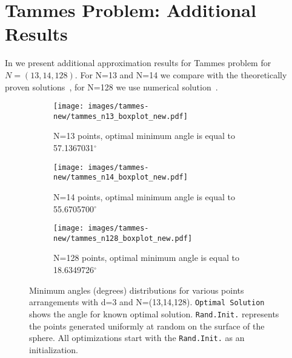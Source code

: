 \documentclass[10pt]{article} %
\begin{document}
\section{Tammes Problem: Additional Results}
\label{app:tammes}
In we present additional approximation results for Tammes problem for $N=(13,14,128)$. For N=13 and N=14 we compare with the theoretically proven solutions~\citep{musin-2012,tammes-problem-for-n14}, for N=128 we use numerical solution~\citep{table-spherical-codes}.

\begin{figure}[ht]
    \begin{subfigure}{\columnwidth}
        \centering
        \texttt{[image: images/tammes-new/tammes\_n13\_boxplot\_new.pdf]}
        \caption{N=13 points, optimal minimum angle is equal to 57.1367031$^{\circ}$}
    \end{subfigure}
    \begin{subfigure}{\columnwidth}
        \centering
        \texttt{[image: images/tammes-new/tammes\_n14\_boxplot\_new.pdf]}
        \caption{N=14 points, optimal minimum angle is equal to 55.6705700$^\circ$}
    \end{subfigure}
    \begin{subfigure}{\columnwidth}
        \centering
        \texttt{[image: images/tammes-new/tammes\_n128\_boxplot\_new.pdf]}
        \caption{N=128 points, optimal minimum angle is equal to 18.6349726$^\circ$}
    \end{subfigure}
\caption{Minimum angles (degrees) distributions for various points arrangements with d=3 and N=(13,14,128). \texttt{Optimal Solution} shows the angle for known optimal solution. \texttt{Rand.Init.} represents the points generated uniformly at random on the surface of the sphere. All optimizations start with the \texttt{Rand.Init.} as an initialization.}
\end{figure}
\end{document}
